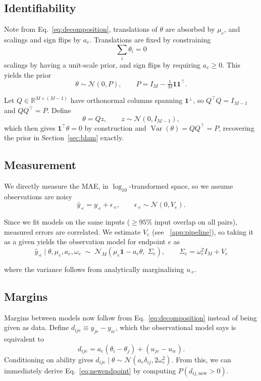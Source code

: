 \documentclass{article}
\DeclareMathOperator{\Var}{Var}
\begin{document}
\subsection{Identifiability}
Note from Eq.~\ref{eq:decomposition}, translations of $\theta$ are absorbed by $\mu_e$, and scalings and sign flips by $a_e$. Translations are fixed by constraining
\begin{equation}
    \sum_i \theta_i = 0
\end{equation}
scalings by having a unit-scale prior, and sign flips by requiring $a_e \geq 0$. This yields the prior
\begin{equation}
  \theta \sim \mathcal{N}(0, P), \qquad P = I_M - \tfrac{1}{M}\mathbf{1}\mathbf{1}^\top.
\end{equation}

Let $Q \in \mathbb{R}^{M \times (M-1)}$ have orthonormal columns spanning $\mathbf{1}^\perp$, so $Q^\top Q = I_{M-1}$ and $QQ^\top = P$. Define
\begin{equation}
  \theta = Qz, \qquad z \sim \mathcal{N}(0, I_{M-1}),
\end{equation}
which then gives $\mathbf{1}^\top \theta = 0$ by construction and
$\Var(\theta) = QQ^\top = P$, recovering the prior in
Section~\ref{sec:blam} exactly.

\subsection{Measurement}
We directly measure the MAE, in $\log_{10}$-transformed space, so we assume observations are noisy
\begin{equation}
    \hat{y}_{\cdot e} = y_{\cdot e} + \epsilon_{\cdot e}, \qquad \epsilon_{\cdot e} \sim \mathcal{N}(0, V_e).
\end{equation}

Since we fit models on the same inputs ($\geq 95\%$ input overlap on all pairs), measured errors are correlated. We estimate $V_e$ (see ~\ref{app:pipeline}), so taking it as a given yields the observation model for endpoint $e$ as
\begin{equation}
  \hat{y}_{\cdot e} \mid \theta, \mu_e, a_e, \omega_e
  \;\sim\; \mathcal{N}_M\!\left(\mu_e \mathbf{1} - a_e \theta,\;
  \Sigma_e \right),
  \qquad \Sigma_e = \omega_e^2 I_M + V_e
  \label{eq:observation}
\end{equation}

where the variance follows from analytically marginalizing $u_{\cdot e}$. 

\subsection{Margins}
\label{app:margins}
Margins between models now follow from Eq.~\ref{eq:decomposition} instead of being given as data. Define $d_{ije} \equiv y_{je} - y_{ie}$, which the observational model says is equivalent to
\begin{equation}
  d_{ije} = a_e(\theta_i - \theta_j) + (u_{je} - u_{ie}).
\end{equation}
Conditioning on ability gives $d_{ije} \mid \theta \sim \mathcal{N}(a_e\delta_{ij}, 2\omega_e^2)$. From this, we can immediately derive Eq.~\ref{eq:newendpoint} by computing $P(d_{ij, \text{new}} > 0)$.
\end{document}

